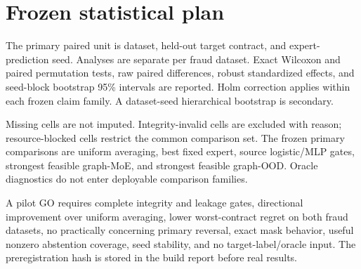 \section{Frozen statistical plan}

The primary paired unit is dataset, held-out target contract, and expert-prediction seed. Analyses are separate per fraud dataset. Exact Wilcoxon and paired permutation tests, raw paired differences, robust standardized effects, and seed-block bootstrap 95\% intervals are reported. Holm correction applies within each frozen claim family. A dataset-seed hierarchical bootstrap is secondary.

Missing cells are not imputed. Integrity-invalid cells are excluded with reason; resource-blocked cells restrict the common comparison set. The frozen primary comparisons are uniform averaging, best fixed expert, source logistic/MLP gates, strongest feasible graph-MoE, and strongest feasible graph-OOD. Oracle diagnostics do not enter deployable comparison families.

A pilot GO requires complete integrity and leakage gates, directional improvement over uniform averaging, lower worst-contract regret on both fraud datasets, no practically concerning primary reversal, exact mask behavior, useful nonzero abstention coverage, seed stability, and no target-label/oracle input. The preregistration hash is stored in the build report before real results.
